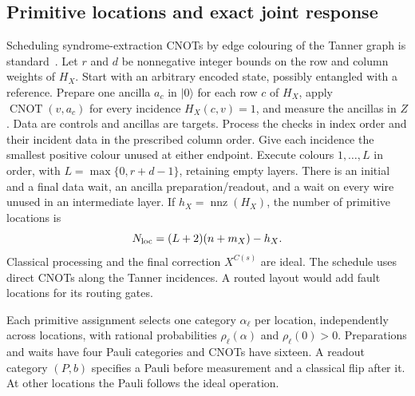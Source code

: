 \documentclass[10pt,twocolumn]{article}
\theoremstyle{definition}
\begin{document}
\subsection{Primitive locations and exact joint response}
Scheduling syndrome-extraction CNOTs by edge colouring of the Tanner
graph is standard~\cite[Sec.~5, Algorithm~1]{DBT21}.
Let $r$ and $d$ be nonnegative integer bounds on the row and column
weights of $H_X$. Start with an
arbitrary encoded state, possibly entangled with a reference. Prepare one
ancilla $a_c$ in $|0\rangle$ for each row $c$ of $H_X$, apply
$\operatorname{CNOT}(v,a_c)$ for every incidence $H_X(c,v)=1$, and measure
the ancillas in $Z$. Data are controls and ancillas are targets. Process
the checks in index order and their incident data in the prescribed
column order. Give each incidence the smallest positive colour unused
at either endpoint. Execute colours $1,\ldots,L$ in order, with
$L=\max\{0,r+d-1\}$, retaining empty layers.
There is an initial and a final data wait, an ancilla preparation/readout,
and a wait on every wire unused in an intermediate layer. If
$h_X=\operatorname{nnz}(H_X)$, the number of primitive locations is
\begin{equation}\label{eq:circ-locations}
 N_{\rm loc}=(L+2)(n+m_X)-h_X.
\end{equation}
Classical processing and the final correction $X^{C(s)}$ are ideal.
The schedule uses direct CNOTs along the Tanner incidences. A routed
layout would add fault locations for its routing gates.

Each primitive assignment selects one category $\alpha_\ell$ per
location, independently across locations, with rational probabilities
$\rho_\ell(\alpha)$ and $\rho_\ell(0)>0$. Preparations and waits have four
Pauli categories and CNOTs have sixteen. A readout category $(P,b)$
specifies a Pauli before measurement and a classical flip after it.
At other locations the Pauli follows the ideal operation.
\end{document}
